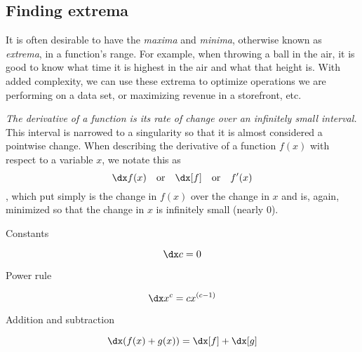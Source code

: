 \subsection{Finding extrema}

It is often desirable to have the \emph{maxima} and \emph{minima}, otherwise known as \emph{extrema}, in a function's range. For example, when throwing a ball in the air, it is good to know what time it is highest in the air and what that height is. With added complexity, we can use these extrema to optimize operations we are performing on a data set, or maximizing revenue in a storefront, etc.


\emph{The derivative of a function is its rate of change over an infinitely small interval.} This interval is narrowed to a singularity so that it is almost considered a pointwise change. When describing the derivative of a function $f(x)$ with respect to a variable $x$, we notate this as
\begin{equation*}
    \dx f(x) \quad \text{or} \quad \dx[f] \quad \text{or} \quad f'(x)
\end{equation*}, which put simply is the change in $f(x)$ over the change in $x$ and is, again, minimized so that the change in $x$ is infinitely small (nearly 0).


\begin{psec}{Constants}

    \begin{equation}\label{eq:derivative constant}
        \dx c = 0
    \end{equation}

\end{psec}

\begin{psec}{Power rule}

    \begin{equation}\label{eq:derivative power}
        \dx x^c = c x^{(c - 1)}
    \end{equation}

\end{psec}

\begin{psec}{Addition and subtraction}

    \begin{equation}\label{eq:derivative add}
        \dx (f(x) + g(x)) = \dx[f] + \dx[g]
    \end{equation}

\end{psec}

